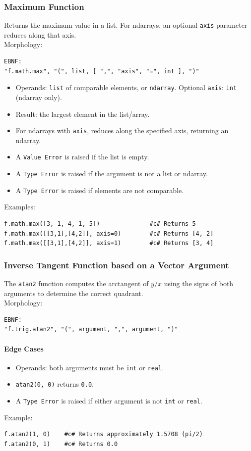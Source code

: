 \subsubsection{Maximum Function}
Returns the maximum value in a list. For ndarrays, an optional \texttt{axis} parameter reduces along that axis. \\
Morphology:
\begin{verbatim}
EBNF:
"f.math.max", "(", list, [ ",", "axis", "=", int ], ")"
\end{verbatim}
\begin{itemize}
\item Operands: \texttt{list} of comparable elements, or \texttt{ndarray}. Optional \texttt{axis}: \texttt{int} (ndarray only).
\item Result: the largest element in the list/array.
\item For ndarrays with \texttt{axis}, reduces along the specified axis, returning an ndarray.
\item A \texttt{Value Error} is raised if the list is empty.
\item A \texttt{Type Error} is raised if the argument is not a list or ndarray.
\item A \texttt{Type Error} is raised if elements are not comparable.
\end{itemize}
Examples:
\begin{verbatim}
f.math.max([3, 1, 4, 1, 5])              #c# Returns 5
f.math.max([[3,1],[4,2]], axis=0)        #c# Returns [4, 2]
f.math.max([[3,1],[4,2]], axis=1)        #c# Returns [3, 4]
\end{verbatim}

\subsubsection{Inverse Tangent Function based on a Vector Argument}
The \texttt{atan2} function computes the arctangent of $y/x$ using the signs of both arguments to determine the correct quadrant. \\
Morphology:
\begin{verbatim}
EBNF:
"f.trig.atan2", "(", argument, ",", argument, ")"
\end{verbatim}
\paragraph{Edge Cases}
\begin{itemize}
\item Operands: both arguments must be \texttt{int} or \texttt{real}.
\item \texttt{atan2(0, 0)} returns \texttt{0.0}.
\item A \texttt{Type Error} is raised if either argument is not \texttt{int} or \texttt{real}.
\end{itemize}
Example:
\begin{verbatim}
f.atan2(1, 0)    #c# Returns approximately 1.5708 (pi/2)
f.atan2(0, 1)    #c# Returns 0.0
\end{verbatim}

